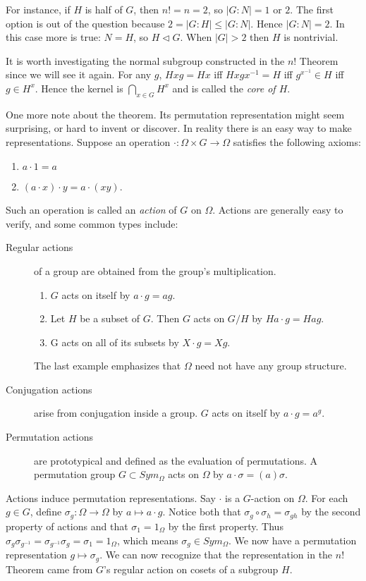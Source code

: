 \documentclass[letterpaper]{article}
\begin{document}
For instance, if $H$ is half of $G$, then $n! = n = 2$, so $|G
\colon N| = 1$ or $2$. The first option is out of the question
because $2 = |G \colon H| \le |G \colon N|$. Hence $|G \colon N| =
2$. In this case more is true: $N = H$, so $H \lhd G$. When $|G| >
2$ then $H$ is nontrivial.

It is worth investigating the normal subgroup constructed in the
$n!$ Theorem since we will see it again. For any $g$, $Hxg = Hx$
iff $Hxgx^{-1} = H$ iff $g^{x^{-1}} \in H$ iff $g \in H^x$. Hence
the kernel is $\bigcap \limits_{x \in G}H^x$ and is called the
\emph{core of $H$}.

One more note about the theorem. Its permutation representation
might seem surprising, or hard to invent or discover. In reality
there is an easy way to make representations. Suppose an operation
$\cdot \colon \Omega \times G \rightarrow \Omega$ satisfies the
following axioms: \begin{enumerate} \item $a \cdot 1 = a$ \item $(a
\cdot x) \cdot y = a \cdot (xy)$.  \end{enumerate} Such an operation
is called an \emph{action} of $G$ on $\Omega$. Actions are generally
easy to verify, and some common types include:

\begin{description}
\item[Regular actions] of a group are obtained from the group's multiplication.
\begin{enumerate}
\item $G$ acts on itself by $a\cdot g = ag$.
\item Let $H$ be a subset of $G$. Then $G$ acts on $G/H$ by $Ha\cdot g = Hag$.
\item G acts on all of its subsets by $X\cdot g = Xg$.
\end{enumerate}
The last example emphasizes that $\Omega$ need not have any group structure.
\item[Conjugation actions] arise from conjugation inside a group. $G$ acts on itself by $a\cdot g = a^g$.
\item[Permutation actions] are prototypical and defined as the evaluation of permutations. A permutation group $G \subset Sym_\Omega$ acts on $\Omega$ by $a\cdot \sigma = (a)\sigma$.
\end{description}

Actions induce permutation representations. Say $\cdot$ is a
$G$-action on $\Omega$. For each $g \in G$, define $\sigma_g \colon
\Omega \rightarrow \Omega$ by $a \mapsto a\cdot g$. Notice both
that $\sigma_g \circ \sigma_h = \sigma_{gh}$ by the second property
of actions and that $\sigma_1 = 1_\Omega$ by the first property.
Thus $\sigma_g \sigma_{g^{-1}} = \sigma_{g^{-1}}\sigma_g = \sigma_1
= 1_\Omega$, which means $\sigma_g \in Sym_\Omega$. We now have a
permutation representation $g \mapsto \sigma_g$. We can now recognize
that the representation in the $n!$ Theorem came from $G$'s regular
action on cosets of a subgroup $H$.
\end{document}
